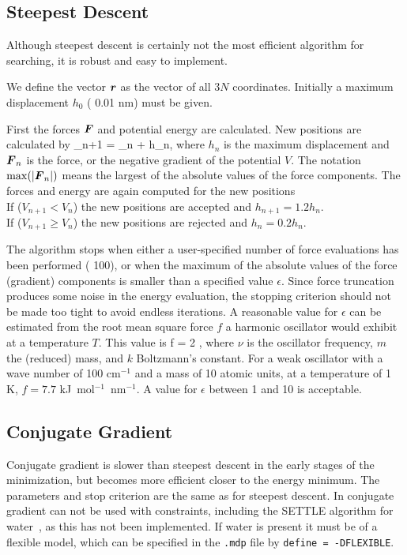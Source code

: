 \subsection{Steepest Descent}
Although steepest descent is certainly not the most efficient
algorithm for searching, it is robust and easy to implement.

We define the vector $\ve{r}$ as the vector of all $3N$ coordinates.
Initially a maximum displacement $h_0$ ({\eg} 0.01 nm) must be given. 

First the forces $\ve{F}$ and potential energy are calculated.
New positions are calculated by
\beq
{}_{n+1} =  _n +  h_n,
\eeq
where $h_n$ is the maximum displacement and $\ve{F}_n$ is the force,
or the negative gradient of the  potential $V$. The notation $\max
(|\ve{F}_n|)$ means the largest of the absolute values of the force
components.  The forces and energy are again computed for the new positions \\
If ($V_{n+1} < V_n$) the new positions are accepted and $h_{n+1} = 1.2
h_n$. \\
If ($V_{n+1} \geq V_n$) the new positions are rejected and $h_n = 0.2 h_n$.

The algorithm stops when either a user-specified number of force 
evaluations has been performed ({\eg} 100), or when the maximum of the absolute
values of the force (gradient) components is smaller than a specified
value $\epsilon$.
Since force truncation produces some noise in the
energy evaluation, the stopping criterion should not be made too tight
to avoid endless iterations. A reasonable value for $\epsilon$ can be
estimated from the root mean square force $f$ a harmonic oscillator would exhibit at a
temperature $T$. This value is
\beq
  f = 2 \pi \nu {},
\eeq
where $\nu$ is the oscillator frequency, $m$ the (reduced) mass, and
$k$ Boltzmann's constant. For a weak oscillator with a wave number of
100 cm$^{-1}$ and a mass of 10 atomic units, at a temperature of 1 K,
$f=7.7$ kJ~mol$^{-1}$~nm$^{-1}$. A value for $\epsilon$ between 1 and
10 is acceptable.   

\subsection{Conjugate Gradient}
Conjugate gradient is slower than steepest descent in the early stages
of the minimization, but becomes more efficient closer to the energy
minimum.  The parameters and stop criterion are the same as for
steepest descent.  In {\gromacs} conjugate gradient can not be used
with constraints, including the SETTLE algorithm for
water~\cite{Miyamoto92}, as this has not been implemented. If water is
present it must be of a flexible model, which can be specified in the
{\tt *.mdp} file by {\tt define = -DFLEXIBLE}.

